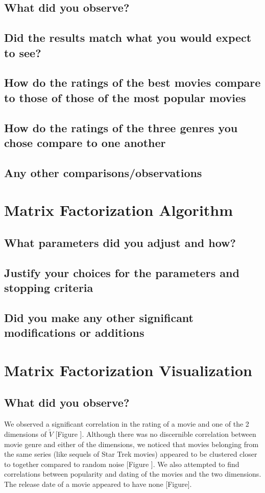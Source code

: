 \subsection{What did you observe?}
\subsection{Did the results match what you would expect to see?}
\subsection{How do the ratings of the best movies compare to those of those of the most popular movies}
\subsection{How do the ratings of the three genres you chose compare to one another}
\subsection{Any other comparisons/observations}

\section{Matrix Factorization Algorithm}
\medskip
\subsection{What parameters did you adjust and how?}
\subsection{Justify your choices for the parameters and stopping criteria}
\subsection{Did you make any other significant modifications or additions}

\section{Matrix Factorization Visualization}
\medskip
\subsection{What did you observe?}
We observed a significant correlation in the rating of a movie and one of the 2 dimensions of $\widetilde{V}$ [Figure ]. Although there was no discernible correlation between movie genre and either of the dimensions, we noticed that movies belonging from the same series (like sequels of Star Trek movies) appeared to be clustered closer to together compared to random noise [Figure ]. We also attempted to find correlations between popularity and dating of the movies and the two dimensions. The release date of a movie appeared to have none [Figure]. 

